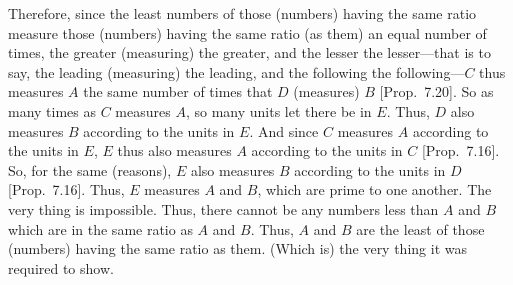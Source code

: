 \begin{Parallel}{}{}
{Therefore, since the least numbers of those (numbers) having the
same ratio measure those (numbers) having the same ratio (as them)
an equal number of times, the greater (measuring) the greater, and
the lesser  the lesser---that is to say, the leading (measuring) the leading, and
the following the following---$C$ thus measures $A$ the same number of
times that $D$ (measures) $B$  [Prop.~7.20].
So as many times as $C$ measures $A$, so many units let there be in $E$.
Thus, $D$ also measures $B$ according to the units in $E$. And since $C$ measures
$A$ according to the units in $E$, $E$ thus also measures $A$ according to the
units in $C$ [Prop.~7.16]. So, for the
same (reasons), $E$ also measures $B$ according to the units in $D$  [Prop.~7.16]. Thus, $E$ measures $A$ and $B$, which
are prime to one another. The very thing is impossible. Thus, there cannot
be any numbers less than $A$ and $B$ which are in the same ratio as $A$ and
$B$. Thus, $A$ and $B$ are the least of those (numbers) having the same ratio
as them. (Which is) the very thing it was required to show.}
\end{Parallel}


